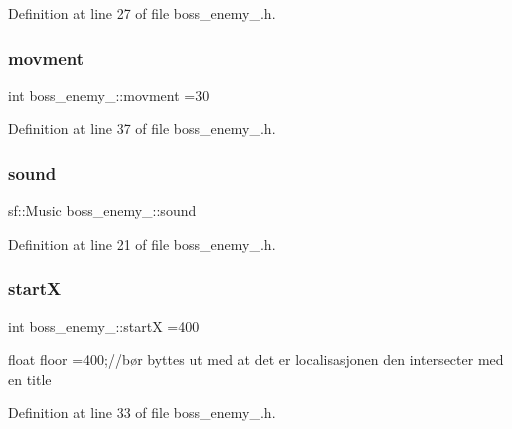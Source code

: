 Definition at line 27 of file boss\+\_\+enemy\+\_.\+h.

\hypertarget{classboss__enemy__2_acda97e45d43d96c23c03f7aedaf0d537}{}\label{classboss__enemy__2_acda97e45d43d96c23c03f7aedaf0d537} 
\subsubsection{\texorpdfstring{movment}{movment}}
{\footnotesize\ttfamily int boss\+\_\+enemy\+\_\+::movment =30}



Definition at line 37 of file boss\+\_\+enemy\+\_.\+h.

\hypertarget{classboss__enemy__2_a46f313cdeff7cbfe637e3b4f6600cc68}{}\label{classboss__enemy__2_a46f313cdeff7cbfe637e3b4f6600cc68} 
\subsubsection{\texorpdfstring{sound}{sound}}
{\footnotesize\ttfamily sf\+::\+Music boss\+\_\+enemy\+\_\+::sound}



Definition at line 21 of file boss\+\_\+enemy\+\_.\+h.

\hypertarget{classboss__enemy__2_aabc3601b0121203650e78430aab3b309}{}\label{classboss__enemy__2_aabc3601b0121203650e78430aab3b309} 
\subsubsection{\texorpdfstring{startX}{startX}}
{\footnotesize\ttfamily int boss\+\_\+enemy\+\_\+::startX =400}



float floor =400;//bør byttes ut med at det er localisasjonen den intersecter med en title 



Definition at line 33 of file boss\+\_\+enemy\+\_.\+h.

\hypertarget{classboss__enemy__2_a6e3d39e8276440d0b4b897aecc63839c}{}\label{classboss__enemy__2_a6e3d39e8276440d0b4b897aecc63839c} 
